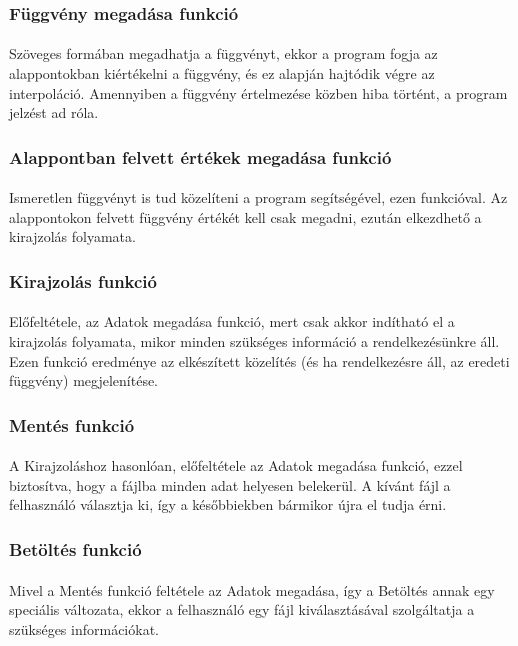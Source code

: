 \documentclass[12pt]{report}
\begin{document}
\subsubsection{Függvény megadása funkció}
\paragraph{}
Szöveges formában megadhatja a függvényt, ekkor a program fogja az alappontokban kiértékelni a függvény, és ez alapján hajtódik végre az interpoláció. Amennyiben a függvény értelmezése közben hiba történt, a program jelzést ad róla.
\subsubsection{Alappontban felvett értékek megadása funkció}
\paragraph{}
Ismeretlen függvényt is tud közelíteni a program segítségével, ezen funkcióval. Az alappontokon felvett függvény értékét kell csak megadni, ezután elkezdhető a kirajzolás folyamata.
\subsubsection{Kirajzolás funkció}
\paragraph{}
Előfeltétele, az Adatok megadása funkció, mert csak akkor indítható el a kirajzolás folyamata, mikor minden szükséges információ a rendelkezésünkre áll. Ezen funkció eredménye az elkészített közelítés (és ha rendelkezésre áll, az eredeti függvény) megjelenítése.
\subsubsection{Mentés funkció}
\paragraph{}
A Kirajzoláshoz hasonlóan, előfeltétele az Adatok megadása funkció, ezzel biztosítva, hogy a fájlba minden adat helyesen belekerül. A kívánt fájl a felhasználó választja ki, így a későbbiekben bármikor újra el tudja érni.
\subsubsection{Betöltés funkció}
\paragraph{}
Mivel a Mentés funkció feltétele az Adatok megadása, így a Betöltés annak egy speciális változata, ekkor a felhasználó egy fájl kiválasztásával szolgáltatja a szükséges információkat.
\newpage
\end{document}
